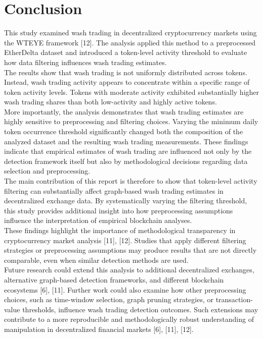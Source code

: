 \documentclass[language=english,thesis=bachelor,nosecondtitle,faculty=cb,onesided,12pt]{hsmw-thesis}
\begin{document}
	\chapter{Conclusion}
This study examined wash trading in decentralized cryptocurrency markets using the WTEYE framework [12]. The analysis applied this method to a preprocessed EtherDelta dataset and introduced a token-level activity threshold to evaluate how data filtering influences wash trading estimates.\\
The results show that wash trading is not uniformly distributed across tokens. Instead, wash trading activity appears to concentrate within a specific range of token activity levels. Tokens with moderate activity exhibited substantially higher wash trading shares than both low-activity and highly active tokens.\\
More importantly, the analysis demonstrates that wash trading estimates are highly sensitive to preprocessing and filtering choices. Varying the minimum daily token occurrence threshold significantly changed both the composition of the analyzed dataset and the resulting wash trading measurements. These findings indicate that empirical estimates of wash trading are influenced not only by the detection framework itself but also by methodological decisions regarding data selection and preprocessing.\\
The main contribution of this report is therefore to show that token-level activity filtering can substantially affect graph-based wash trading estimates in decentralized exchange data. By systematically varying the filtering threshold, this study provides additional insight into how preprocessing assumptions influence the interpretation of empirical blockchain analyses.\\
These findings highlight the importance of methodological transparency in cryptocurrency market analysis [11], [12]. Studies that apply different filtering strategies or preprocessing assumptions may produce results that are not directly comparable, even when similar detection methods are used.\\
Future research could extend this analysis to additional decentralized exchanges, alternative graph-based detection frameworks, and different blockchain ecosystems [6], [11]. Further work could also examine how other preprocessing choices, such as time-window selection, graph pruning strategies, or transaction-value thresholds, influence wash trading detection outcomes. Such extensions may contribute to a more reproducible and methodologically robust understanding of manipulation in decentralized financial markets [6], [11], [12].
\clearpage
\end{document}
